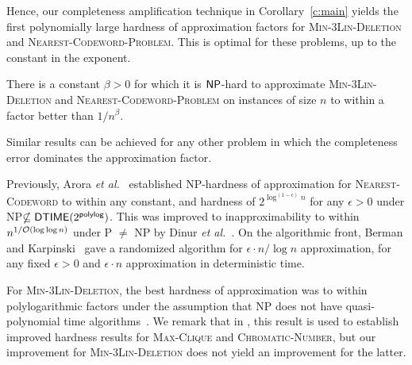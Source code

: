 Hence, our completeness amplification technique in Corollary~\ref{c:main} yields the first polynomially large hardness of approximation factors for \textsc{Min-3Lin-Deletion} and \textsc{Nearest-Codeword-Problem}. This is optimal for these problems, up to the constant in the exponent.

\begin{theorem} There is a constant $\beta >0$ for which 
it is ${\sf {\sf NP}}$-hard to approximate \textsc{Min-3Lin-Deletion} and \textsc{Nearest-Codeword-Problem} on instances of size $n$
to within a factor better than $1/n^{\beta}$.
\end{theorem}

Similar results can be achieved for any other problem in which the completeness error dominates the approximation factor. 

Previously, 
Arora {\em et al.}~\cite{ABSS} established {\sf NP}-hardness of approximation for \textsc{Nearest-Codeword} to within any constant, and hardness of
$2^{\log^{(1-\epsilon)}n}$ for any $\epsilon > 0$ under {\sf NP}$
\nsubseteq {\sf DTIME}(2^{\sf poly log})$. This was improved to
inapproximability to within $n^{1/{\cal O}(\log\log n)}$ under {\sf P} $\neq$ {\sf NP} by Dinur {\em et al.}~\cite{DKRS}. On the
algorithmic front, Berman and Karpinski~\cite{BK} gave a randomized
algorithm for $\epsilon\cdot n/\log n$ approximation, for any fixed $\epsilon >0$ and $\epsilon \cdot n$ approximation in deterministic time.

For \textsc{Min-3Lin-Deletion}, the best hardness of approximation was to within polylogarithmic factors under the assumption that {\sf NP} does not have quasi-polynomial time algorithms~\cite{KP}. We remark that in \cite{KP}, this result is used to establish improved hardness results for \textsc{Max-Clique} and \textsc{Chromatic-Number}, but our improvement for \textsc{Min-3Lin-Deletion} does not yield an improvement for the latter.

